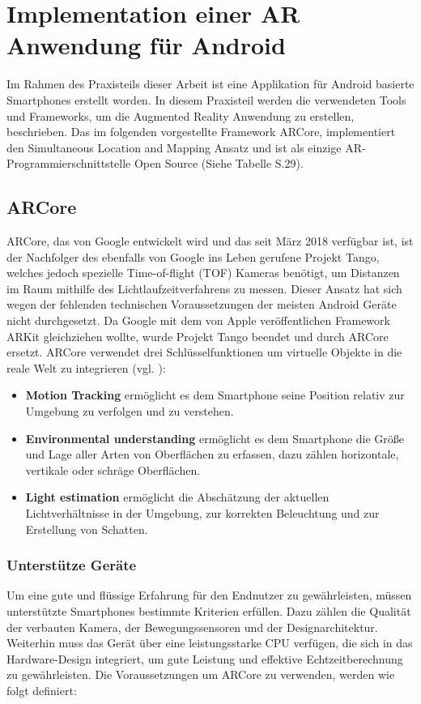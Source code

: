\chapter{Implementation einer AR Anwendung für Android}
Im Rahmen des Praxisteils dieser Arbeit ist eine Applikation für Android basierte Smartphones erstellt worden. In diesem Praxisteil werden die verwendeten Tools und Frameworks, um die Augmented Reality Anwendung zu erstellen, beschrieben. Das im folgenden vorgestellte Framework ARCore, implementiert den Simultaneous Location and Mapping Ansatz und ist als einzige AR-Programmierschnittstelle Open Source (Siehe Tabelle S.29).



\section{ARCore}
ARCore, das von Google entwickelt wird und das seit März 2018 verfügbar ist, ist der Nachfolger des ebenfalls von Google ins Leben gerufene Projekt Tango, welches jedoch spezielle \glqq Time-of-flight\grqq{} (TOF) Kameras benötigt, um Distanzen im Raum mithilfe des Lichtlaufzeitverfahrens zu messen. Dieser Ansatz hat sich wegen der fehlenden technischen Voraussetzungen der meisten Android Geräte nicht durchgesetzt. Da Google mit dem von Apple veröffentlichen Framework ARKit gleichziehen wollte, wurde Projekt Tango beendet und durch ARCore ersetzt. ARCore verwendet drei Schlüsselfunktionen um virtuelle Objekte in die reale Welt zu integrieren (vgl. \cite{arcore}):

\begin{itemize}
\item \textbf{Motion Tracking} ermöglicht es dem Smartphone seine Position relativ zur Umgebung zu verfolgen und zu verstehen.

\item \textbf{Environmental understanding} ermöglicht es dem Smartphone die Größe und Lage aller Arten von Oberflächen  zu erfassen, dazu zählen horizontale, vertikale oder schräge Oberflächen.

\item \textbf{Light estimation} ermöglicht die Abschätzung der aktuellen Lichtverhältnisse in der Umgebung, zur korrekten Beleuchtung und zur Erstellung von Schatten.
\end{itemize}

\subsection{Unterstütze Geräte}
Um eine gute und flüssige Erfahrung für den Endnutzer zu gewährleisten, müssen unterstützte Smartphones bestimmte Kriterien erfüllen. Dazu zählen die Qualität der verbauten Kamera, der Bewegungssensoren und der Designarchitektur. Weiterhin muss das Gerät über eine leistungsstarke CPU verfügen, die sich in das Hardware-Design integriert, um gute Leistung und effektive Echtzeitberechnung zu gewährleisten. Die Voraussetzungen um ARCore zu verwenden, werden wie folgt definiert:


